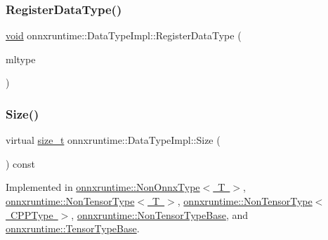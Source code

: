 \subsubsection{\texorpdfstring{Register\+Data\+Type()}{RegisterDataType()}}
{\footnotesize\ttfamily \mbox{\hyperlink{mlasi_8h_a88f941d423cb2a819b70a1358982b1a6}{void}} onnxruntime\+::\+Data\+Type\+Impl\+::\+Register\+Data\+Type (\begin{DoxyParamCaption}\item[{\mbox{\hyperlink{namespaceonnxruntime_ad77d0a6e838ec7da5dc35fed5ee66b49}{M\+L\+Data\+Type}}}]{mltype }\end{DoxyParamCaption})\hspace{0.3cm}{\ttfamily [static]}}

\mbox{\label{classonnxruntime_1_1DataTypeImpl_a025f1d860799cd7bc187482742ce7baa}} 
\subsubsection{\texorpdfstring{Size()}{Size()}}
{\footnotesize\ttfamily virtual \mbox{\hyperlink{mlasi_8h_a503efbc1c6e50825320ad909366b78ab}{size\+\_\+t}} onnxruntime\+::\+Data\+Type\+Impl\+::\+Size (\begin{DoxyParamCaption}{ }\end{DoxyParamCaption}) const\hspace{0.3cm}{\ttfamily [pure virtual]}}



Implemented in \mbox{\hyperlink{classonnxruntime_1_1NonOnnxType_a563b71919e9400bb66cee0702d98b232}{onnxruntime\+::\+Non\+Onnx\+Type$<$ T $>$}}, \mbox{\hyperlink{classonnxruntime_1_1NonTensorType_a514c297618cdb975d4f98a5b47321086}{onnxruntime\+::\+Non\+Tensor\+Type$<$ T $>$}}, \mbox{\hyperlink{classonnxruntime_1_1NonTensorType_a514c297618cdb975d4f98a5b47321086}{onnxruntime\+::\+Non\+Tensor\+Type$<$ C\+P\+P\+Type $>$}}, \mbox{\hyperlink{classonnxruntime_1_1NonTensorTypeBase_ab81811ddad81a55603074f90c4297d56}{onnxruntime\+::\+Non\+Tensor\+Type\+Base}}, and \mbox{\hyperlink{classonnxruntime_1_1TensorTypeBase_a1455fddb91004f40b6d060af404779e0}{onnxruntime\+::\+Tensor\+Type\+Base}}.

\mbox{\label{classonnxruntime_1_1DataTypeImpl_a19d1875191b844febe10a4a62dca8bba}} 
